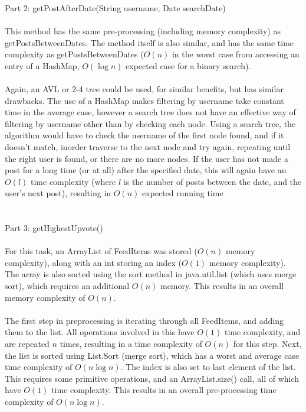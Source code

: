 \documentclass{article}
\begin{document}
	\\ \\ \\
	Part 2: getPostAfterDate(String username, Date searchDate) \\ \\
	This method has the same pre-processing (including memory complexity) as getPostsBetweenDates. The method itself is also similar, and has the same time complexity as getPostsBetweenDates ($O(n)$ in the worst case from accessing an entry of a HashMap, $O(\log n)$ expected case for a binary search). \\ \\
	Again, an AVL or 2-4 tree could be used, for similar benefits, but has similar drawbacks. The use of a HashMap makes filtering by username take constant time in the average case, however a search tree does not have an effective way of filtering by username other than by checking each node. Using a search tree, the algorithm would have to check the username of the first node found, and if it doesn't match, inorder traverse to the next node and try again, repeating until the right user is found, or there are no more nodes. If the user has not made a post for a long time (or at all) after the specified date, this will again have an $O(l)$ time complexity (where $l$ is the number of posts between the date, and the user's next post), resulting in $O(n)$ expected running time
	\\ \\ \\
	Part 3: getHighestUpvote() \\ \\
	For this task, an ArrayList of FeedItems was stored ($O(n)$ memory complexity), along with an int storing an index ($O(1)$ memory complexity). The array is also sorted using the sort method in java.util.list (which uses merge sort), which requires an additional $O(n)$ memory. This results in an overall memory complexity of $O(n)$. \\ \\
	The first step in preprocessing is iterating through all FeedItems, and adding them to the list. All operations involved in this have $O(1)$ time complexity, and are repeated $n$ times, resulting in a time complexity of $O(n)$ for this step. Next, the list is sorted using List.Sort (merge sort), which has a worst and average case time complexity of $O(n \log n)$. The index is also set to last element of the list. This requires some primitive operations, and an ArrayList.size() call, all of which have $O(1)$ time complexity. This results in an overall pre-processing time complexity of $O(n \log n)$.  \\ \\
\end{document}

